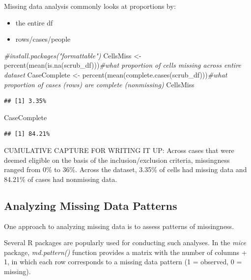 \documentclass[
  english,
]{book}
\newenvironment{Shaded}{\begin{snugshade}}{\end{snugshade}}
\newcommand{\CommentTok}[1]{\textcolor[rgb]{0.56,0.35,0.01}{\textit{#1}}}
\newcommand{\FunctionTok}[1]{\textcolor[rgb]{0.00,0.00,0.00}{#1}}
\newcommand{\NormalTok}[1]{#1}
\newcommand{\OtherTok}[1]{\textcolor[rgb]{0.56,0.35,0.01}{#1}}
\providecommand{\tightlist}{%
  \setlength{\itemsep}{0pt}\setlength{\parskip}{0pt}}
\begin{document}
Missing data analysis commonly looks at proportions by:

\begin{itemize}
\tightlist
\item
  the entire df
\item
  rows/cases/people
\end{itemize}

\begin{Shaded}
\begin{Highlighting}[]
\CommentTok{\#install.packages("formattable")}
\NormalTok{CellsMiss }\OtherTok{\textless{}{-}} \FunctionTok{percent}\NormalTok{(}\FunctionTok{mean}\NormalTok{(}\FunctionTok{is.na}\NormalTok{(scrub\_df)))}\CommentTok{\#what proportion of cells missing across entire dataset}
\NormalTok{CaseComplete }\OtherTok{\textless{}{-}} \FunctionTok{percent}\NormalTok{(}\FunctionTok{mean}\NormalTok{(}\FunctionTok{complete.cases}\NormalTok{(scrub\_df)))}\CommentTok{\#what proportion of cases (rows) are complete (nonmissing)}
\NormalTok{CellsMiss}
\end{Highlighting}
\end{Shaded}

\begin{verbatim}
## [1] 3.35%
\end{verbatim}

\begin{Shaded}
\begin{Highlighting}[]
\NormalTok{CaseComplete}
\end{Highlighting}
\end{Shaded}

\begin{verbatim}
## [1] 84.21%
\end{verbatim}

CUMULATIVE CAPTURE FOR WRITING IT UP: Across cases that were deemed eligible on the basis of the inclusion/exclusion criteria, missingness ranged from 0\% to 36\%. Across the dataset, 3.35\% of cells had missing data and 84.21\% of cases had nonmissing data.

\hypertarget{analyzing-missing-data-patterns}{%
\subsection{Analyzing Missing Data Patterns}\label{analyzing-missing-data-patterns}}

One approach to analyzing missing data is to assess patterns of missingness.

Several R packages are popularly used for conducting such analyses. In the \emph{mice} package, \emph{md.pattern()} function provides a matrix with the number of columns + 1, in which each row corresponds to a missing data pattern (1 = observed, 0 = missing).
\end{document}
